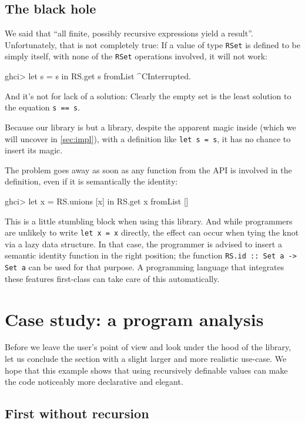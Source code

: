 \documentclass[manuscript,anonymous,screen,acmsmall]{acmart}
\begin{document}
\subsection{The black hole}\label{sec:blackhole}

We said that “all finite, possibly recursive expressions yield a result”. Unfortunately, that is not completely true: If a value of type \verb|RSet| is defined to be simply itself, with none of the \verb|RSet| operations involved, it will not work:
\begin{code}
ghci> let s = s in RS.get s
fromList ^CInterrupted.
\end{code}
And it’s not for lack of a solution: Clearly the empty set is the least solution to the equation \verb|s == s|.

Because our library is but a library, despite the apparent magic inside (which we will uncover in \cref{sec:impl}), with a definition like \verb|let s = s|, it has no chance to insert its magic.

The problem goes away as soon as any function from the API is involved in the definition, even if it is semantically the identity:
\begin{code}
ghci> let x = RS.unions [x] in RS.get x
fromList []
\end{code}

This is a little stumbling block when using this library. And while programmers are unlikely to write \verb|let x = x| directly, the effect can occur when tying the knot via a lazy data structure. In that case, the programmer is advised to insert a semantic identity function in the right position; the function \verb|RS.id :: Set a -> Set a| can be used for that purpose.
A programming language that integrates these features first-class can take care of this automatically.

\section{Case study: a program analysis}\label{sec:casestudy}

Before we leave the user's point of view and look under the hood of the library, let us conclude the section with a slight larger and more realistic use-case. We hope that this example shows that using recursively definable values can make the code noticeably more declarative and elegant.

\subsection{First without recursion}
\end{document}
